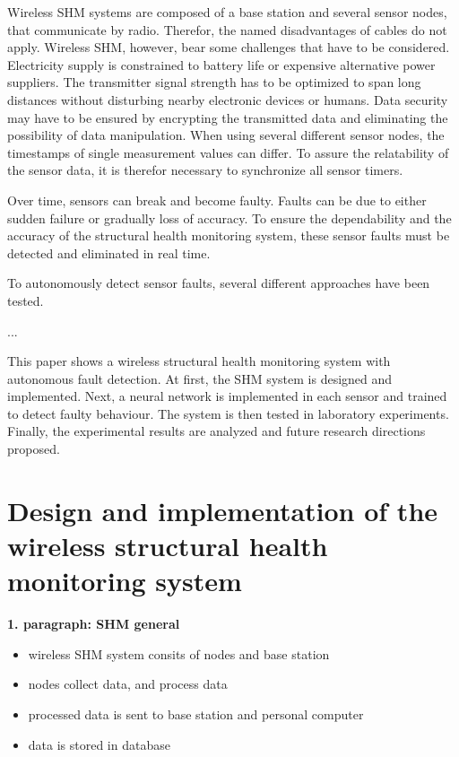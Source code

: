 \documentclass[12pt]{scrartcl}
\begin{document}
Wireless SHM systems are composed of a base station and several sensor nodes, that communicate by radio. Therefor, the named disadvantages of cables do not apply.
Wireless SHM, however, bear some challenges that have to be considered. 
Electricity supply is constrained to battery life or expensive alternative power suppliers.
The transmitter signal strength has to be optimized to span long distances without disturbing nearby electronic devices or humans.
Data security may have to be ensured by encrypting the transmitted data and eliminating the possibility of data manipulation.
When using several different sensor nodes, the timestamps of single measurement values can differ. 
To assure the relatability of the sensor data, it is therefor necessary to synchronize all sensor timers. 

Over time, sensors can break and become faulty. Faults can be due to either sudden failure or gradually loss of accuracy.
To ensure the dependability and the accuracy of the structural health monitoring system, these sensor faults must be detected and eliminated in real time. 

To autonomously detect sensor faults, several different approaches have been tested.

...



This paper shows a wireless structural health monitoring system with autonomous fault detection. 
At first, the SHM system is designed and implemented. 
Next, a neural network is implemented in each sensor and trained to detect faulty behaviour. 
The system is then tested in laboratory experiments. 
Finally, the experimental results are analyzed and future research directions proposed.

\newpage


\section*{Design and implementation of the wireless structural health monitoring system}

\textbf{1. paragraph: SHM general}

\begin{itemize}
\item wireless SHM system consits of nodes and base station
\item nodes collect data, and process data
\item processed data is sent to base station and personal computer
\item data is stored in database
\end{itemize}
\end{document}
